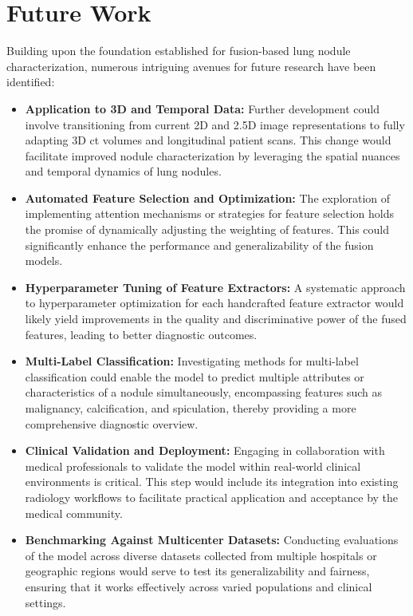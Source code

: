 \section{Future Work}

Building upon the foundation established for fusion-based lung nodule characterization, numerous intriguing avenues for future research have been identified:

\begin{itemize}
    \item \textbf{Application to 3D and Temporal Data:} Further development could involve transitioning from current 2D and 2.5D image representations to fully adapting 3D \ac{ct} volumes and longitudinal patient scans. This change would facilitate improved nodule characterization by leveraging the spatial nuances and temporal dynamics of lung nodules.

    \item \textbf{Automated Feature Selection and Optimization:} The exploration of implementing attention mechanisms or strategies for feature selection holds the promise of dynamically adjusting the weighting of features. This could significantly enhance the performance and generalizability of the fusion models.

    \item \textbf{Hyperparameter Tuning of Feature Extractors:} A systematic approach to hyperparameter optimization for each handcrafted feature extractor would likely yield improvements in the quality and discriminative power of the fused features, leading to better diagnostic outcomes.

    \item \textbf{Multi-Label Classification:} Investigating methods for multi-label classification could enable the model to predict multiple attributes or characteristics of a nodule simultaneously, encompassing features such as malignancy, calcification, and spiculation, thereby providing a more comprehensive diagnostic overview.

    \item \textbf{Clinical Validation and Deployment:} Engaging in collaboration with medical professionals to validate the model within real-world clinical environments is critical. This step would include its integration into existing radiology workflows to facilitate practical application and acceptance by the medical community.

    \item \textbf{Benchmarking Against Multicenter Datasets:} Conducting evaluations of the model across diverse datasets collected from multiple hospitals or geographic regions would serve to test its generalizability and fairness, ensuring that it works effectively across varied populations and clinical settings.
\end{itemize}


